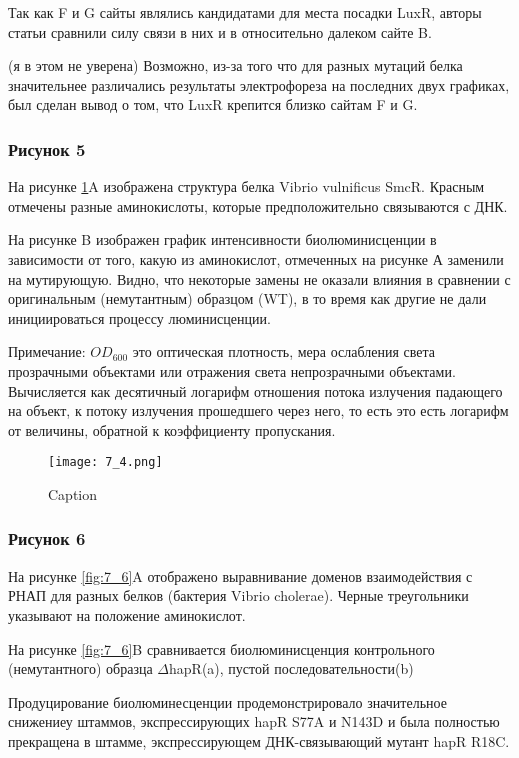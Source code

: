 Так как F и G сайты являлись кандидатами для места посадки LuxR, авторы статьи сравнили силу связи  в них и в относительно далеком сайте B.

(я в этом не уверена)
Возможно, из-за того что для разных мутаций белка значительнее различались результаты электрофореза на последних двух графиках, был сделан вывод о том, что LuxR крепится близко сайтам F и G.

\subsubsection{Рисунок 5}

На рисунке \ref{fig:7_4}A изображена структура белка Vibrio vulnificus SmcR. Красным отмечены разные аминокислоты, которые предположительно связываются с ДНК. 

На рисунке B изображен график интенсивности биолюминисценции в зависимости от того, какую из аминокислот, отмеченных на рисунке А заменили на мутирующую. Видно, что некоторые замены не оказали влияния в сравнении с оригинальным (немутантным) образцом (WT), в то время как другие не дали инициироваться процессу люминисценции.

Примечание: $OD_{600}$ это оптическая плотность, мера ослабления света прозрачными объектами или отражения света непрозрачными объектами. Вычисляется как десятичный логарифм отношения потока излучения падающего на объект, к потоку излучения прошедшего через него, то есть это есть логарифм от величины, обратной к коэффициенту пропускания.

\begin{figure}
    \centering
    \texttt{[image: 7\_4.png]}
    \caption{Caption}
    \label{fig:7_4}
\end{figure}

\subsubsection{Рисунок 6}

На рисунке \ref{fig:7_6}A отображено выравнивание доменов взаимодействия с РНАП для разных белков (бактерия Vibrio cholerae). Черные треугольники указывают на положение аминокислот. 

На рисунке \ref{fig:7_6}B сравнивается биолюминисценция контрольного (немутантного) образца $\Delta$hapR(a), пустой последовательности(b)

Продуцирование биолюминесценции продемонстрировало значительное снижениеу штаммов, экспрессирующих hapR S77A и N143D и была полностью прекращена в штамме, экспрессирующем ДНК-связывающий мутант hapR R18C. 

